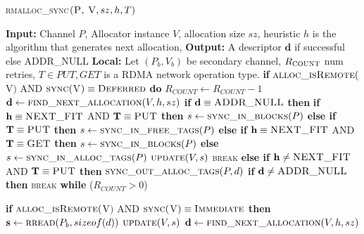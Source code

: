 \documentclass[10pt]{article}
\begin{document}
\begin{algorithm}{}
\footnotesize
\caption{\textsc{rmalloc\_sync}{$\textsc{(P, V}, sz, h, T)$}}
\label{alg:rmalloc_sync} 
\begin{algorithmic}[1]


\STATE \textbf{Input:} Channel $P$, Allocator instance $V$, allocation size $sz$, heuristic $h$
is the algorithm that generates next allocation, 
\STATE \textbf{Output:} A descriptor {$\textbf{d}$} if successful else \textsc{ADDR\_NULL}
\STATE \textbf{Local:} Let $(P_{b}, V_{b})$ be secondary channel, $R_{\textsc{COUNT}}$ num retries, $T\in {PUT, GET}$ is a RDMA network operation type.
\STATE \textbf{if} $\textsc{alloc\_isRemote}($V$)$ AND $\textsc{sync}($V$) \equiv \textsc{Deferred}$ 
\STATE \quad \textbf{do}
\STATE \qquad $R_{COUNT} \gets R_{COUNT}-1$
\STATE \qquad $\textbf{d} \leftarrow  \textsc{find\_next\_allocation}(V, h, sz)$ 
\STATE \qquad \textbf{if} $\textbf{d} \equiv \textsc{ADDR\_NULL}$ \textbf{then}
\STATE \qquad \quad \textbf{if} $\textbf{h} \equiv \textsc{NEXT\_FIT}$ AND $\textbf{T} \equiv \textsc{PUT}$ \textbf{then}
\STATE \qquad \qquad $s \gets \textsc{sync\_in\_blocks}(P)$
\STATE \qquad \quad\textbf{else if} $\textbf{T} \equiv \textsc{PUT}$ \textbf{then}
\STATE \qquad \qquad $s \gets \textsc{sync\_in\_free\_tags}(P)$
\STATE \qquad \quad\textbf{else if} $\textbf{h} \equiv \textsc{NEXT\_FIT}$ AND $\textbf{T} \equiv \textsc{GET}$ \textbf{then}
\STATE \qquad \qquad $s \gets \textsc{sync\_in\_blocks}(P)$
\STATE \qquad \quad\textbf{else} 
\STATE \qquad \qquad $s \gets \textsc{sync\_in\_alloc\_tags}(P)$
\STATE \qquad \quad $\textsc{update}(V, s)$
\STATE \qquad \quad \textsc{break}
\STATE \qquad \textbf{else if}  $\textbf{h} \neq \textsc{NEXT\_FIT}$ AND $\textbf{T} \equiv \textsc{PUT}$ \textbf{then}
\STATE \qquad \quad $\textsc{sync\_out\_alloc\_tags}(P, d)$
\STATE \qquad \textbf{if}  $\textbf{d} \neq \textsc{ADDR\_NULL}$ \textbf{then}
\STATE \qquad \quad \textsc{break}
\STATE \quad \textbf{while} ($R_{COUNT} > 0$)

\STATE \textbf{if} $\textsc{alloc\_isRemote}($V$)$ AND $\textsc{sync}($V$) \equiv \textsc{Immediate}$ \textbf{then}
\STATE \quad $\textbf{s} \gets \textsc{rread}(P_{b}, sizeof(d))$ 
\STATE \quad $\textsc{update}(V, s)$
\STATE \quad $\textbf{d} \gets \textsc{find\_next\_allocation}(V, h, sz)$ 


\end{algorithmic}
\end{algorithm}
\end{document}
